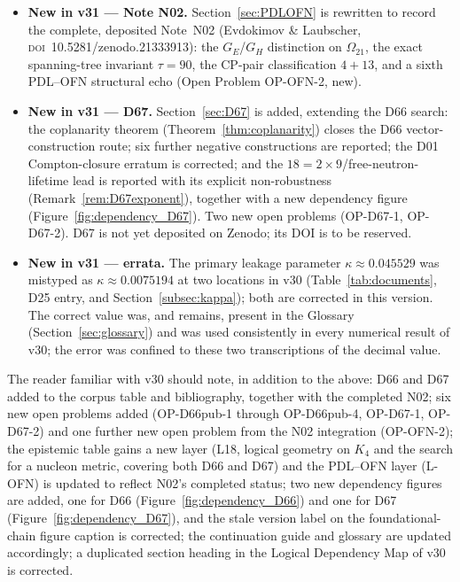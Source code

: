 \documentclass[11pt,a4paper]{article}
\theoremstyle{plain}
\theoremstyle{definition}
\theoremstyle{remark}
\begin{document}
\begin{itemize}
\item \textbf{New in v31 --- Note N02.} Section~\ref{sec:PDLOFN} is rewritten to record the complete, deposited Note~N02 (Evdokimov \& Laubscher, \textsc{doi}~10.5281/zenodo.21333913): the $G_E$/$G_H$ distinction on $\Omega_{21}$, the exact spanning-tree invariant $\tau=90$, the CP-pair classification $4+13$, and a sixth PDL--OFN structural echo (Open Problem OP-OFN-2, new).
\item \textbf{New in v31 --- D67.} Section~\ref{sec:D67} is added, extending the D66 search: the coplanarity theorem (Theorem~\ref{thm:coplanarity}) closes the D66 vector-construction route; six further negative constructions are reported; the D01 Compton-closure erratum is corrected; and the $18=2\times9$/free-neutron-lifetime lead is reported with its explicit non-robustness (Remark~\ref{rem:D67exponent}), together with a new dependency figure (Figure~\ref{fig:dependency_D67}). Two new open problems (OP-D67-1, OP-D67-2). D67 is not yet deposited on Zenodo; its DOI is to be reserved.
\item \textbf{New in v31 --- errata.} The primary leakage parameter $\kappa\approx0.045529$ was mistyped as $\kappa\approx0.0075194$ at two locations in v30 (Table~\ref{tab:documents}, D25 entry, and Section~\ref{subsec:kappa}); both are corrected in this version. The correct value was, and remains, present in the Glossary (Section~\ref{sec:glossary}) and was used consistently in every numerical result of v30; the error was confined to these two transcriptions of the decimal value.
\end{itemize}

The reader familiar with v30 should note, in addition to the above: D66 and D67 added to the corpus table and bibliography, together with the completed N02; six new open problems added (OP-D66pub-1 through OP-D66pub-4, OP-D67-1, OP-D67-2) and one further new open problem from the N02 integration (OP-OFN-2); the epistemic table gains a new layer (L18, logical geometry on $K_4$ and the search for a nucleon metric, covering both D66 and D67) and the PDL--OFN layer (L-OFN) is updated to reflect N02's completed status; two new dependency figures are added, one for D66 (Figure~\ref{fig:dependency_D66}) and one for D67 (Figure~\ref{fig:dependency_D67}), and the stale version label on the foundational-chain figure caption is corrected; the continuation guide and glossary are updated accordingly; a duplicated section heading in the Logical Dependency Map of v30 is corrected.
\end{document}
